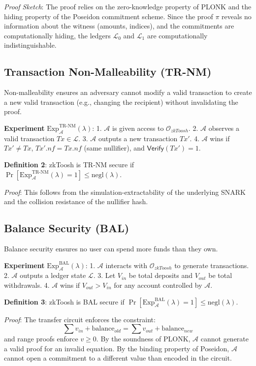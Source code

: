 \documentclass[conference]{IEEEtran}
\begin{document}
\textit{Proof Sketch}: The proof relies on the zero-knowledge property of PLONK and the hiding property of the Poseidon commitment scheme. Since the proof $\pi$ reveals no information about the witness (amounts, indices), and the commitments are computationally hiding, the ledgers $\mathcal{L}_0$ and $\mathcal{L}_1$ are computationally indistinguishable.

\subsection{Transaction Non-Malleability (TR-NM)}

Non-malleability ensures an adversary cannot modify a valid transaction to create a new valid transaction (e.g., changing the recipient) without invalidating the proof.

\textbf{Experiment} $\text{Exp}^{\text{TR-NM}}_{\mathcal{A}}(\lambda)$:
1. $\mathcal{A}$ is given access to $\mathcal{O}_{zkToosh}$.
2. $\mathcal{A}$ observes a valid transaction $Tx \in \mathcal{L}$.
3. $\mathcal{A}$ outputs a new transaction $Tx'$.
4. $\mathcal{A}$ wins if $Tx' \neq Tx$, $Tx'.nf = Tx.nf$ (same nullifier), and $\mathsf{Verify}(Tx') = 1$.

\textbf{Definition 2}: zkToosh is TR-NM secure if $\Pr[\text{Exp}^{\text{TR-NM}}_{\mathcal{A}}(\lambda) = 1] \leq \text{negl}(\lambda)$.

\textit{Proof}: This follows from the simulation-extractability of the underlying SNARK and the collision resistance of the nullifier hash.

\subsection{Balance Security (BAL)}

Balance security ensures no user can spend more funds than they own.

\textbf{Experiment} $\text{Exp}^{\text{BAL}}_{\mathcal{A}}(\lambda)$:
1. $\mathcal{A}$ interacts with $\mathcal{O}_{zkToosh}$ to generate transactions.
2. $\mathcal{A}$ outputs a ledger state $\mathcal{L}$.
3. Let $V_{in}$ be total deposits and $V_{out}$ be total withdrawals.
4. $\mathcal{A}$ wins if $V_{out} > V_{in}$ for any account controlled by $\mathcal{A}$.

\textbf{Definition 3}: zkToosh is BAL secure if $\Pr[\text{Exp}^{\text{BAL}}_{\mathcal{A}}(\lambda) = 1] \leq \text{negl}(\lambda)$.

\textit{Proof}: The transfer circuit enforces the constraint:
\begin{equation}
\sum v_{in} + \text{balance}_{old} = \sum v_{out} + \text{balance}_{new}
\end{equation}
and range proofs enforce $v \geq 0$. By the soundness of PLONK, $\mathcal{A}$ cannot generate a valid proof for an invalid equation. By the binding property of Poseidon, $\mathcal{A}$ cannot open a commitment to a different value than encoded in the circuit.
\end{document}
